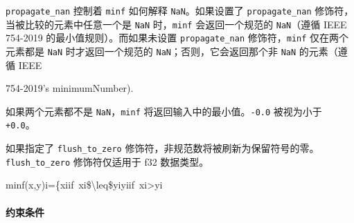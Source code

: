 \documentclass{article}
\begin{document}
\texttt{propagate\_nan} 控制着 \texttt{minf} 如何解释 \texttt{NaN}。如果设置了 \texttt{propagate\_nan} 修饰符，当被比较的元素中任意一个是 \texttt{NaN} 时，\texttt{minf} 会返回一个规范的 \texttt{NaN}（遵循 IEEE 754-2019 的最小值规则）。而如果未设置 \texttt{propagate\_nan} 修饰符，\texttt{minf} 仅在两个元素都是 \texttt{NaN} 时才返回一个规范的 \texttt{NaN}；否则，它会返回那个非 \texttt{NaN} 的元素（遵循 IEEE

754-2019's minimumNumber).




如果两个元素都不是 \texttt{NaN}，\texttt{minf} 将返回输入中的最小值。\texttt{-0.0} 被视为小于 \texttt{+0.0}。



如果指定了 \texttt{flush\_to\_zero} 修饰符，非规范数将被刷新为保留符号的零。\texttt{flush\_to\_zero} 修饰符仅适用于 f32 数据类型。



minf(x,y)i=\{xiif xi\$\textbackslash{}leq\$yiyiif xi>yi




\paragraph{约束条件}
\end{document}
